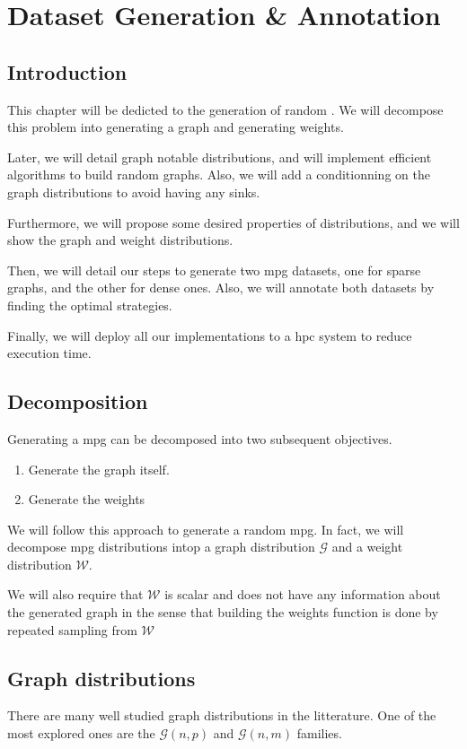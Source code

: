 \chapter{Dataset Generation \& Annotation}
\label{section:Dataset}
\label{chapter:Dataset}
\section*{Introduction}
This chapter will be dedicted to the generation of random . We will decompose this problem into generating a graph and generating weights. 

Later, we will detail graph notable distributions, and will implement efficient algorithms to build random graphs. Also, we will add a conditionning on the graph distributions to avoid having any sinks. 

Furthermore, we will propose some desired properties of  distributions, and we will show the graph and weight distributions.

Then, we will detail our steps to generate two \acrshort{mpg} datasets, one for sparse graphs, and the other for dense ones. Also, we will annotate both datasets by finding the optimal strategies.

Finally, we will deploy all our implementations to a \acrshort{hpc} system to reduce execution time.
\section{Decomposition}
Generating a \acrshort{mpg} can be decomposed into two subsequent objectives.
\begin{enumerate}
	\item Generate the graph itself.
	\item Generate the weights
\end{enumerate}
We will follow this approach to generate a random \acrshort{mpg}. In fact, we will decompose \acrshort{mpg} distributions intop a graph distribution $\mathcal{G}$ and a weight distribution $\mathcal{W}.$ 

We will also require that $\mathcal{W}$ is scalar and does not have any information about the generated graph in the sense that building the weights function is done by repeated sampling from $\mathcal{W}$
\section{Graph distributions}
There are many well studied graph distributions in the litterature. One of the most explored ones are the $\mathcal{G}(n,p)$ and $\mathcal{G}(n,m)$ families.

